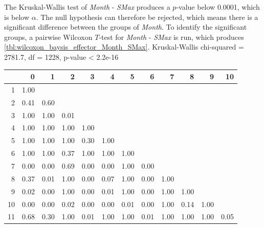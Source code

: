 The Kruskal-Wallis test of \textit{Month} - \textit{SMax} produces a $p$-value below 0.0001, which is below $\alpha$. The null hypothesis can therefore be rejected, which means there is a significant difference between the groups of \textit{Month}. To identify the significant groups, a pairwise Wilcoxon $T$-test for \textit{Month} - \textit{SMax} is run, which produces \cref{tbl:wilcoxon_baysis_effector_Month_SMax}. 
Kruskal-Wallis chi-squared = 2781.7, df = 1228, p-value < 2.2e-16
% 
\begin{tabular}{rrrrrrrrrrrr}
  \hline
 & 0 & 1 & 2 & 3 & 4 & 5 & 6 & 7 & 8 & 9 & 10 \\ 
  \hline
1 & 1.00 &  &  &  &  &  &  &  &  &  &  \\ 
  2 & 0.41 & 0.60 &  &  &  &  &  &  &  &  &  \\ 
  3 & 1.00 & 1.00 & 0.01 &  &  &  &  &  &  &  &  \\ 
  4 & 1.00 & 1.00 & 1.00 & 1.00 &  &  &  &  &  &  &  \\ 
  5 & 1.00 & 1.00 & 1.00 & 0.30 & 1.00 &  &  &  &  &  &  \\ 
  6 & 1.00 & 1.00 & 0.37 & 1.00 & 1.00 & 1.00 &  &  &  &  &  \\ 
  7 & 0.00 & 0.00 & 0.69 & 0.00 & 0.00 & 1.00 & 0.00 &  &  &  &  \\ 
  8 & 0.37 & 0.01 & 1.00 & 0.00 & 0.07 & 1.00 & 0.00 & 1.00 &  &  &  \\ 
  9 & 0.02 & 0.00 & 1.00 & 0.00 & 0.01 & 1.00 & 0.00 & 1.00 & 1.00 &  &  \\ 
  10 & 0.00 & 0.00 & 0.02 & 0.00 & 0.00 & 0.01 & 0.00 & 1.00 & 0.14 & 1.00 &  \\ 
  11 & 0.68 & 0.30 & 1.00 & 0.01 & 1.00 & 1.00 & 0.01 & 1.00 & 1.00 & 1.00 & 0.05 \\ 
   \hline
\end{tabular}
% 
